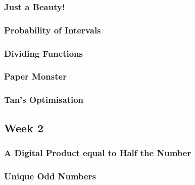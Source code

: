 \documentclass[titlepage=true]{scrartcl}
\begin{document}
        \subsubsection{Just a Beauty!}
            \label{7-1-3}  
            
        \newpage

        \subsubsection{Probability of Intervals}
            \label{7-1-4}  
            
        \newpage

        \subsubsection{Dividing Functions}
            \label{7.1.5}  
            
        \newpage

        \subsubsection{Paper Monster}
            \label{7.1.6}  
            
        \newpage
        
        \subsubsection{Tan's Optimisation}
            \label{7.1.7}  
            
        \newpage
        
    \subsection{Week 2}
        
        \subsubsection{A Digital Product equal to Half the Number}
        	\label{7.2.1}  
        	
        \newpage
        
        \subsubsection{Unique Odd Numbers}
        	\label{7.2.2}  
        	
        \newpage
\end{document}
